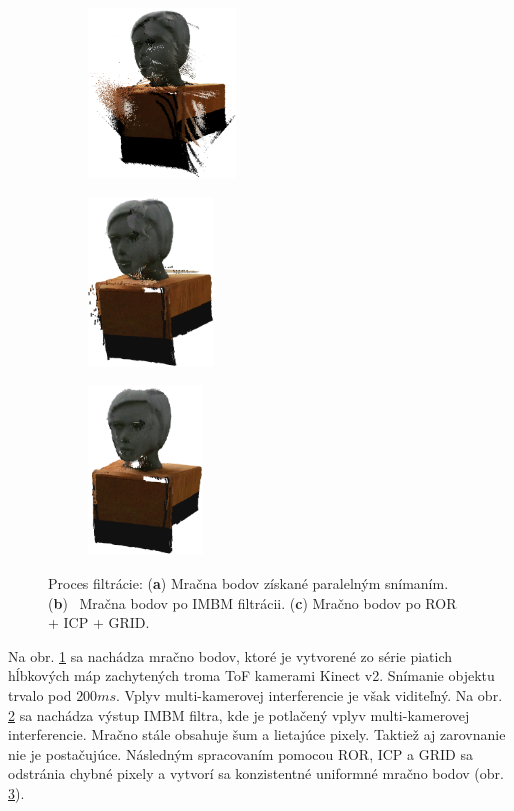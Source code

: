 \begin{figure}[H]
	\centering
	\begin{subfigure}[b]{0.32\textwidth}
		\centering
		\includegraphics[height=4.5cm]{figures/model_input.png}
		\caption{}
		\label{fig:model:input}
	\end{subfigure}
	\hfill
	\begin{subfigure}[b]{0.32\textwidth}
		\centering
		\includegraphics[height=4.5cm]{figures/model_orig.png}
		\caption{}
		\label{fig:model:imbm}
	\end{subfigure}
	\hfill
	\begin{subfigure}[b]{0.32\textwidth}
		\centering
		\includegraphics[height=4.5cm]{figures/model_output.png}
		\caption{}
		\label{fig:model:result}
	\end{subfigure}
	\caption{Proces filtrácie: (\textbf{a}) Mračna bodov získané paralelným snímaním. (\textbf{b}) \, Mračna bodov po IMBM filtrácii. (\textbf{c}) Mračno bodov po ROR + ICP + GRID.}
	\label{fig:model}
\end{figure}


Na obr. \ref{fig:model:input} sa nachádza mračno bodov, ktoré je vytvorené zo série piatich hĺbkových máp zachytených troma ToF kamerami Kinect v2. Snímanie objektu trvalo pod $200ms$. Vplyv multi-kamerovej interferencie je však viditeľný. Na obr. \ref{fig:model:imbm} sa nachádza výstup IMBM filtra, kde je potlačený vplyv multi-kamerovej interferencie. Mračno stále obsahuje šum a lietajúce pixely. Taktiež aj zarovnanie nie je postačujúce. Následným spracovaním pomocou ROR, ICP a GRID sa odstránia chybné pixely a vytvorí sa konzistentné uniformné mračno bodov (obr. \ref{fig:model:result}).



